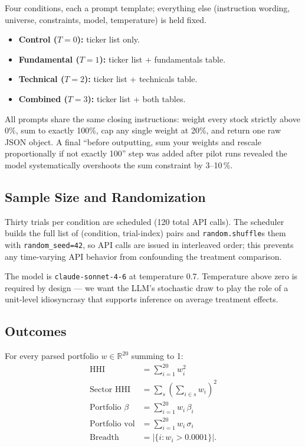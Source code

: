 \documentclass[11pt]{article}
\begin{document}
Four conditions, each a prompt template; everything else (instruction
wording, universe, constraints, model, temperature) is held fixed.

\begin{itemize}
\item \textbf{Control ($T=0$):} ticker list only.
\item \textbf{Fundamental ($T=1$):} ticker list + fundamentals table.
\item \textbf{Technical ($T=2$):} ticker list + technicals table.
\item \textbf{Combined ($T=3$):} ticker list + both tables.
\end{itemize}

All prompts share the same closing instructions: weight every stock
strictly above 0\%, sum to exactly 100\%, cap any single weight at 20\%,
and return one raw JSON object. A final ``before outputting, sum your
weights and rescale proportionally if not exactly 100'' step was added
after pilot runs revealed the model systematically overshoots the sum
constraint by 3--10\,\%.

\subsection{Sample Size and Randomization}

Thirty trials per condition are scheduled (120 total API calls). The
scheduler builds the full list of (condition, trial-index) pairs and
\texttt{random.shuffle}s them with \texttt{random\_seed=42}, so API calls
are issued in interleaved order; this prevents any time-varying API
behavior from confounding the treatment comparison.

The model is \texttt{claude-sonnet-4-6} at temperature 0.7. Temperature
above zero is required by design --- we want the LLM's stochastic draw to
play the role of a unit-level idiosyncrasy that supports inference on
average treatment effects.

\subsection{Outcomes}

For every parsed portfolio $w \in \mathbb{R}^{20}$ summing to 1:
\begin{align*}
\text{HHI} &= \textstyle\sum_{i=1}^{20} w_i^2 \\
\text{Sector HHI} &= \textstyle\sum_{s} \left(\sum_{i \in s} w_i\right)^2 \\
\text{Portfolio } \beta &= \textstyle\sum_{i=1}^{20} w_i\, \beta_i \\
\text{Portfolio vol} &= \textstyle\sum_{i=1}^{20} w_i\, \sigma_i \\
\text{Breadth} &= |\{i : w_i > 0.0001\}|.
\end{align*}
\end{document}
